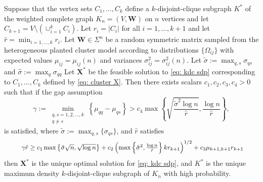\documentclass[twoside,11pt]{article}
\newcommand{\bs}{\boldsymbol}
\newcommand{\X}{\bs {X}}
\newcommand{\0}{\bs{0}}
\newcommand{\rbra}[1]{\ensuremath{\left( #1 \right)}} %
\newcommand{\bra}[1]{\ensuremath{\left\{ #1 \right\}}} %
\newcommand{\kdc}{\(k\)-disjoint-clique }
\begin{document}
{\begin{theorem} \label{thm: rec}
	Suppose that the vertex sets \(C_1,\dots,C_k\) define a \(k\)-disjoint-clique subgraph \(K^*\) of the weighted
	complete graph
	\(K_n = (V,\bs W)\) on \(n\) vertices and let \(C_{k+1} = V \setminus \left(\cup_{i=1}^k C_i \right)\). Let \(r_i = |C_i|\) for all
	\(i=1,\dots,k+1\) and let \(\hat{r} = \min_{i=1,\dots,k} r_i\).
	Let \(\bs{W} \in \Sigma^n\)
	be a random symmetric matrix sampled from the heterogeneous planted cluster model according to distributions \(\{\Omega_{ij} \}\) with expected values \(\mu_{ij} = \mu_{ij}(n)\) and variances
	\(\sigma_{ij}^2 = \sigma_{ij}^2(n)\).
	Let $\tilde \sigma := \max_{q,s} \sigma_{qs}$ and
	$\hat \sigma := \max_{q} \sigma_{qq}$
	Let \(\X^*\) be the feasible solution to \eqref{eq: kdc sdp} corresponding to \(C_1,\dots,C_k\) defined by
	\eqref{eq: cluster X}. Then there exists scalars \(c_1, c_2, c_3, c_4 > 0\) such that if
	the gap assumption
	\begin{equation}
	\label{eq:brendan_27_mod}
		\gamma := \min_{\substack{q,s=1,2,\dots, k \\ q\neq s}} \bra{\mu_{qq} - \mu_{qs}}
		> c_4 \max \bra{ \sqrt{  \frac{\tilde \sigma^2 \log n }{\hat r} },
		\frac{\log n }{\hat r} },
	\end{equation}
		is satisfied,
		where $\tilde \sigma := \max_{q,s}\{ \sigma_{qs}\}$,
		and $\hat r$ satisfies
	\begin{equation}\label{eq:smallest_largest}
	\resizebox{0.92\textwidth}{!}{
		\(
		\gamma \hat r \ge %
		{  c_1 \max\left\lbrace \tilde\sigma\sqrt{n},  \sqrt{\log n} \right\rbrace
			+ c_2 \rbra{ \max \bra{\hat\sigma^2, \frac{\log n}{\hat r} } k r_{k+1} }^{1/2} + c_3 \mu_{k+1, k+1} r_{k+1} }		\)}
	\end{equation}
	then \(\bs{X}^*\) is the unique optimal solution for \eqref{eq: kdc sdp}, and \(K^*\) is the unique maximum density \kdc
	subgraph of \(K_n\) with high probability.
\end{theorem}
%

}
\end{document}
